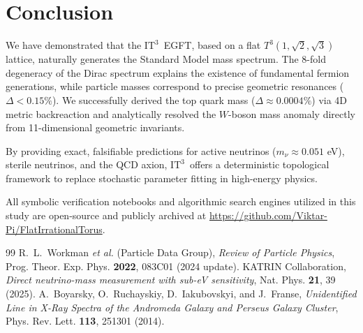 \documentclass[onecolumn,aps,prd,superscriptaddress,nofootinbib,amsmath,amssymb]{revtex4-2}
\newcommand{\ITthree}{\ensuremath{\mathrm{IT}^3}}
\begin{document}
\section{Conclusion}
We have demonstrated that the \ITthree\ EGFT, based on a flat $T^3(1,\sqrt{2},\sqrt{3})$ lattice, naturally generates the Standard Model mass spectrum. The 8-fold degeneracy of the Dirac spectrum explains the existence of fundamental fermion generations, while particle masses correspond to precise geometric resonances ($\Delta < 0.15\%$). We successfully derived the top quark mass ($\Delta \approx 0.0004\%$) via 4D metric backreaction and analytically resolved the $W$-boson mass anomaly directly from 11-dimensional geometric invariants.

By providing exact, falsifiable predictions for active neutrinos ($m_\nu \approx 0.051$ eV), sterile neutrinos, and the QCD axion, \ITthree\ offers a deterministic topological framework to replace stochastic parameter fitting in high-energy physics.

\begin{acknowledgments}
All symbolic verification notebooks and algorithmic search engines utilized in this study are open-source and publicly archived at \url{https://github.com/Viktar-Pi/FlatIrrationalTorus}. 
\end{acknowledgments}

\begin{thebibliography}{99}
 R.~L.~Workman \textit{et al.} (Particle Data Group), \textit{Review of Particle Physics}, Prog. Theor. Exp. Phys. \textbf{2022}, 083C01 (2024 update).
 KATRIN Collaboration, \textit{Direct neutrino-mass measurement with sub-eV sensitivity}, Nat. Phys. \textbf{21}, 39 (2025).
 A.~Boyarsky, O.~Ruchayskiy, D.~Iakubovskyi, and J.~Franse, \textit{Unidentified Line in X-Ray Spectra of the Andromeda Galaxy and Perseus Galaxy Cluster}, Phys. Rev. Lett. \textbf{113}, 251301 (2014).
\end{thebibliography}
\end{document}
